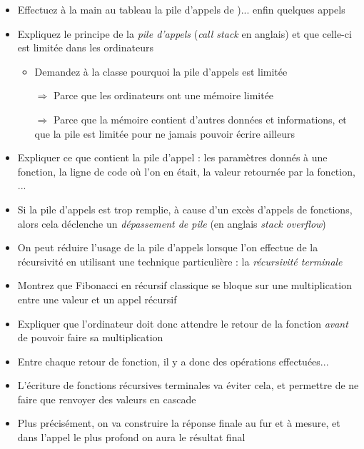 \documentclass[11pt,a4paper]{article}
\begin{document}
\begin{itemize}
\item Effectuez à la main au tableau la pile d'appels de )... enfin quelques appels
\item Expliquez le principe de la \textit{pile d'appels} (\textit{call stack} en anglais) et que celle-ci est limitée dans les ordinateurs
  \begin{itemize}[label=$\bullet$]
  \item Demandez à la classe pourquoi la pile d'appels est limitée
  \item[$\Rightarrow$] Parce que les ordinateurs ont une mémoire limitée
  \item[$\Rightarrow$] Parce que la mémoire contient d'autres données et informations, et que la pile est limitée pour ne jamais pouvoir écrire ailleurs
  \end{itemize}
\item Expliquer ce que contient la pile d'appel : les paramètres donnés à une fonction, la ligne de code où l'on en était, la valeur retournée par la fonction, ...
\item Si la pile d'appels est trop remplie, à cause d'un excès d'appels de fonctions, alors cela déclenche un \textit{dépassement de pile} (en anglais \textit{stack overflow})
\end{itemize}

\medskip

\begin{itemize}
\item On peut réduire l'usage de la pile d'appels lorsque l'on effectue de la récursivité en utilisant une technique particulière : la \textit{récursivité terminale}
\item Montrez que Fibonacci en récursif classique se bloque sur une multiplication entre une valeur et un appel récursif
\item Expliquer que l'ordinateur doit donc attendre le retour de la fonction \textit{avant} de pouvoir faire sa multiplication
\item Entre chaque retour de fonction, il y a donc des opérations effectuées...
\item L'écriture de fonctions récursives terminales va éviter cela, et permettre de ne faire que renvoyer des valeurs en cascade
\item Plus précisément, on va construire la réponse finale au fur et à mesure, et dans l'appel le plus profond on aura le résultat final
\end{itemize}
\end{document}

